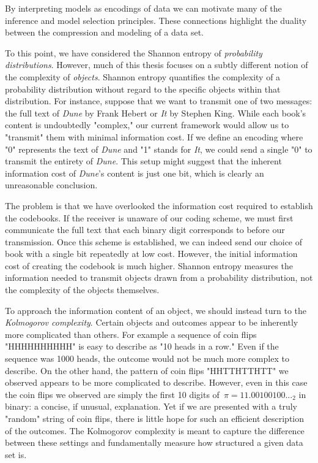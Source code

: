 By interpreting models as encodings of data we can motivate many of the inference and model selection principles. These connections highlight the duality between the compression and modeling of a data set.

To this point, we have considered the Shannon entropy of \emph{probability distributions}. However, much of this thesis focuses on a subtly different notion of the complexity of \emph{objects}. Shannon entropy quantifies the complexity of a probability distribution without regard to the specific objects within that distribution. For instance, suppose that we want to transmit one of two messages: the full text of \textit{Dune} by Frank Hebert or \textit{It} by Stephen King. While each book's content is undoubtedly "complex," our current framework would allow us to "transmit" them with minimal information cost. If we define an encoding where "0" represents the text of \textit{Dune} and "1" stands for \textit{It}, we could send a single "0" to transmit the entirety of \textit{Dune}. This setup might suggest that the inherent information cost of \textit{Dune}'s content is just one bit, which is clearly an unreasonable conclusion.

The problem is that we have overlooked the information cost required to establish the codebooks. If the receiver is unaware of our coding scheme, we must first communicate the full text that each binary digit corresponds to before our transmission. Once this scheme is established, we can indeed send our choice of book with a single bit repeatedly at low cost. However, the initial information cost of creating the codebook is much higher. Shannon entropy measures the information needed to transmit objects drawn from a probability distribution, not the complexity of the objects themselves.

To approach the information content of an object, we should instead turn to the \emph{Kolmogorov complexity}. Certain objects and outcomes appear to be inherently more complicated than others. For example a sequence of coin flips "HHHHHHHHHH" is easy to describe as "10 heads in a row." Even if the sequence was 1000 heads, the outcome would not be much more complex to describe. On the other hand, the pattern of coin flips "HHTTHTTHTT" we observed appears to be more complicated to describe. However, even in this case the coin flips we observed are simply the first 10 digits of~$\pi = 11.00100100..._2$ in binary: a concise, if unusual, explanation. Yet if we are presented with a truly "random" string of coin flips, there is little hope for such an efficient description of the outcomes. The Kolmogorov complexity is meant to capture the difference between these settings and fundamentally measure how structured a given data set is. 

